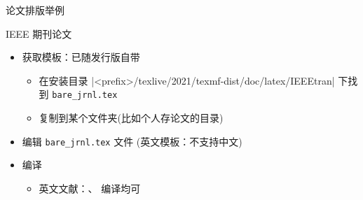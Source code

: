 \begin{frame}[fragile]{论文排版举例}
  \begin{exampleblock}{IEEE 期刊论文}
    \begin{itemize}
      \item 获取模板：已随发行版自带
        \begin{itemize}
          \item 在安装目录 |<prefix>/texlive/2021/texmf-dist/doc/latex/IEEEtran|
          下找到 \verb"bare_jrnl.tex"
          \item 复制到某个文件夹(比如个人存论文的目录)
        \end{itemize}
      \item 编辑 \verb"bare_jrnl.tex" 文件 (英文模板：不支持中文)
      \item 编译
        \begin{itemize}
          \item 英文文献：\XeLaTeX{}、\pdfLaTeX{} 编译均可
        \end{itemize}
    \end{itemize}
  \end{exampleblock}
\end{frame}
